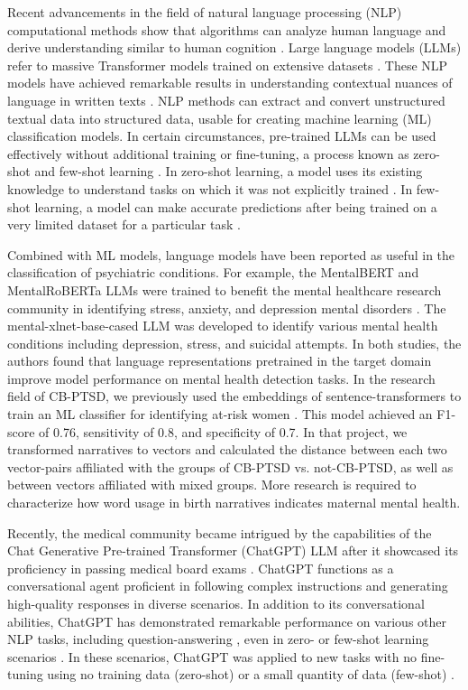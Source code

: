 \documentclass[bst/sn-nature]{sn-jnl}%
\theoremstyle{thmstyleone}%
\theoremstyle{thmstyletwo}%
\theoremstyle{thmstylethree}%
\begin{document}
Recent advancements in the field of natural language processing (NLP) computational methods show that algorithms can analyze human language and derive understanding similar to human cognition \cite{brown2020language}.
Large language models (LLMs) refer to massive Transformer models trained on extensive datasets \cite{brants2007large}.
These NLP models have achieved remarkable results in understanding contextual nuances of language in written texts \cite{brown2020language}.
NLP methods can extract and convert unstructured textual data into structured data, usable for creating machine learning (ML) classification models.
In certain circumstances, pre-trained LLMs can be used effectively without additional training or fine-tuning, a process known as zero-shot and few-shot learning \cite{brown2020language}.
In zero-shot learning, a model uses its existing knowledge to understand tasks on which it was not explicitly trained \cite{brown2020language}.
In few-shot learning, a model can make accurate predictions after being trained on a very limited dataset for a particular task  \cite{brown2020language}.

Combined with ML models, language models have been reported as useful in the classification of psychiatric conditions.
For example, the MentalBERT and MentalRoBERTa LLMs were trained to benefit the mental healthcare research community in identifying stress, anxiety, and depression mental disorders \cite{ji2021mentalbert}.
The mental-xlnet-base-cased \cite{ji2023domain} LLM was developed to identify various  mental health conditions including depression, stress, and suicidal attempts.
In both studies, the authors found that language representations pretrained in the target domain improve model performance on mental health detection tasks.
In the research field of CB-PTSD, we previously used the embeddings of sentence-transformers to train an ML classifier for identifying at-risk women \cite{bartal2023identifying}.
This model achieved an F1-score of 0.76, sensitivity of 0.8, and specificity of 0.7.
In that project, we transformed narratives to vectors and calculated the distance between each two vector-pairs affiliated with the groups of CB-PTSD vs. not-CB-PTSD, as well as between vectors affiliated with mixed groups.
More research is required to characterize how word usage in birth narratives indicates maternal mental health.

Recently, the medical community became intrigued by the capabilities of the Chat Generative Pre-trained Transformer (ChatGPT) LLM after it showcased its proficiency in passing medical board exams \cite{gordijn2023chatgpt}.
ChatGPT functions as a conversational agent proficient in following complex instructions and generating high-quality responses in diverse scenarios.
In addition to its conversational abilities, ChatGPT has demonstrated remarkable performance on various other NLP tasks, including question-answering \cite{bang2023multitask}, even in zero- or few-shot learning scenarios \cite{brown2020language}.
In these scenarios, ChatGPT was applied to new tasks with no fine-tuning using no training data (zero-shot) or a small quantity of data (few-shot) \cite{brown2020language}.
\end{document}
